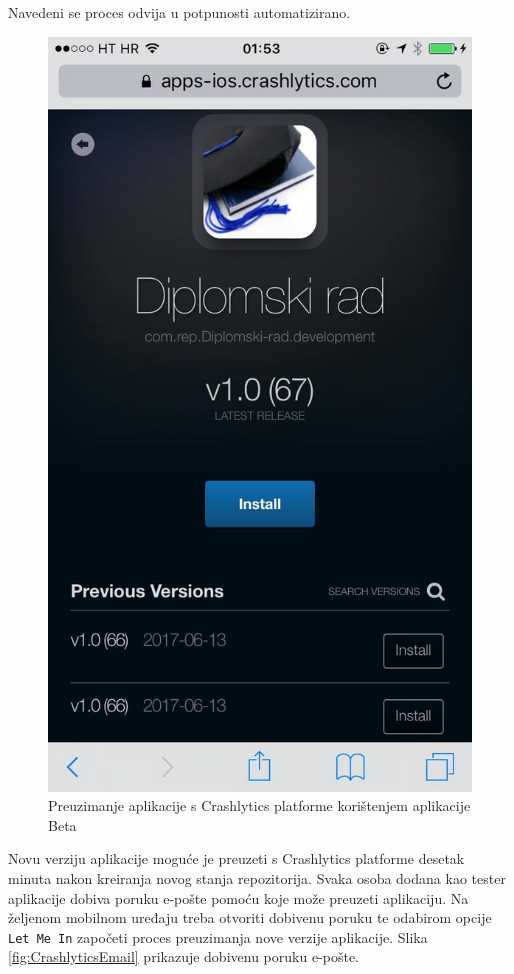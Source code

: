 \documentclass[times, utf8, diplomski, numeric]{fer}
\begin{document}
Navedeni se proces odvija u potpunosti automatizirano.

\begin{figure}[b!]
\centering
\includegraphics[scale=0.3]{Beta}
\caption{Preuzimanje aplikacije s Crashlytics platforme korištenjem aplikacije Beta}
\label{fig:Beta}
\end{figure}

Novu verziju aplikacije moguće je preuzeti s Crashlytics platforme desetak minuta nakon kreiranja novog stanja repozitorija. Svaka osoba dodana kao tester aplikacije dobiva poruku e-pošte pomoću koje može preuzeti aplikaciju. Na željenom mobilnom uređaju treba otvoriti dobivenu poruku te odabirom opcije \verb|Let Me In| započeti proces preuzimanja nove verzije aplikacije. Slika \ref{fig:CrashlyticsEmail} prikazuje dobivenu poruku e-pošte.
\end{document}
